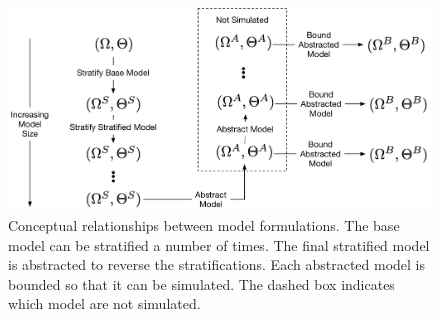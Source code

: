 \begin{figure}
	\includegraphics[width=\linewidth]{fig/sirhd_experiment_layout.pdf}
	\caption{\label{fig:sirhd_experiment_layout} Conceptual relationships between model formulations.  The base model can be stratified a number of times.  The final stratified model is abstracted to reverse the stratifications.  Each abstracted model is bounded so that it can be simulated. The dashed box indicates which model are not simulated.}
\end{figure}

